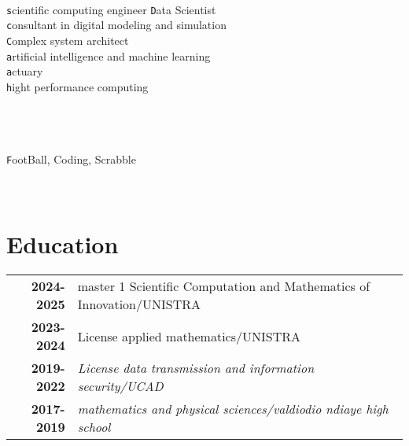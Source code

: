 \documentclass[lighthipster]{simplehipstercv}
\begin{document}
\begin{paracol}{2}
{\begin{flushleft}
\bigskip

\\[0.3em]

\texttt scientific computing engineer
\texttt Data Scientist\\
\texttt consultant in digital modeling and simulation\\
\texttt Complex system architect\\
\texttt artificial intelligence and machine learning\\
\texttt actuary\\
\texttt hight performance computing\\

\vspace{1em}
\\
\\
\bigskip

 \\[0.5em]
\texttt FootBall, Coding, Scrabble

\end{flushleft}
\phantom{turn the page}

}

\switchcolumn

\small
\section{}

\begin{tabular}{r| p{} c}
   
\end{tabular}
\vspace{1em}

\begin{minipage}[t]{0.35\textwidth}
\section*{Education}
\begin{tabular}{>{\footnotesize\bfseries}r >{\footnotesize}p{}}
    2024-2025 & master 1 Scientific Computation and Mathematics of Innovation/UNISTRA\\
    2023-2024 & License applied mathematics/UNISTRA\\
    2019-2022 & \emph{License data transmission and information security/UCAD} \\
    2017-2019 & \emph{mathematics and physical sciences/valdiodio ndiaye high school} \\
\end{tabular}
\end{minipage}\hfill
\begin{minipage}[t]{0.3\textwidth}
\begin{flushleft}

\end{flushleft}
\end{minipage}
\end{paracol}
\end{document}
